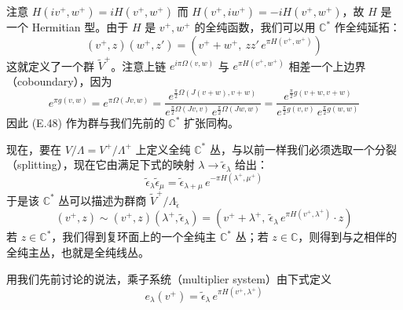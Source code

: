 
注意 $H(iv^+,w^+) = iH(v^+,w^+)$ 而 $H(v^+,iw^+) = -iH(v^+,w^+)$，故 $H$ 是一个
Hermitian 型。由于 $H$ 是 $v^+,w^+$ 的全纯函数，我们可以用 $\mathbb{C}^*$ 作全纯延拓：
\begin{equation}
  (v^+,z)(w^+,z') = \left(v^+ + w^+,\ zz'\,e^{\pi H(v^+,w^+)}\right)
  \tag{E.48}
  \label{eq:E.48}
\end{equation}
这就定义了一个群 $\tilde V^+$。注意上链 $e^{i\pi\Omega(v,w)}$ 与 $e^{\pi H(v^+,w^+)}$
相差一个上边界（coboundary），因为
\begin{equation}
  e^{\pi g(v,w)} = e^{\pi\Omega(Jv,w)}
  = \frac{e^{\frac{\pi}{2}\Omega(J(v+w),v+w)}}
         {e^{\frac{\pi}{2}\Omega(Jv,v)}\,e^{\frac{\pi}{2}\Omega(Jw,w)}}
  = \frac{e^{\frac{\pi}{2}g(v+w,v+w)}}
         {e^{\frac{\pi}{2}g(v,v)}\,e^{\frac{\pi}{2}g(w,w)}}
  \tag{E.49}
  \label{eq:E.49}
\end{equation}
因此 (E.48) 作为群与我们先前的 $\mathbb{C}^*$ 扩张同构。

现在，要在 $V/\Lambda = V^+/\Lambda^+$ 上定义全纯 $\mathbb{C}^*$ 丛，与以前一样我们必须选取一个分裂（splitting），现在它由满足下式的映射 $\lambda\to\tilde\epsilon_\lambda$ 给出：
\begin{equation}
  \tilde\epsilon_\lambda\tilde\epsilon_\mu
  = \tilde\epsilon_{\lambda+\mu}\,e^{-\pi H(\lambda^+,\mu^+)}
  \tag{E.50}
  \label{eq:E.50}
\end{equation}
于是该 $\mathbb{C}^*$ 丛可以描述为群商 $\tilde V^+/\Lambda_{\tilde\epsilon}$
\begin{equation}
  (v^+,z)\sim(v^+,z)(\lambda^+,\tilde\epsilon_\lambda)
  = \left(v^+ + \lambda^+,\ \tilde\epsilon_\lambda\,e^{\pi H(v^+,\lambda^+)}\cdot z\right)
  \tag{E.51}
  \label{eq:E.51}
\end{equation}
若 $z\in\mathbb{C}^*$，我们得到复环面上的一个全纯主 $\mathbb{C}^*$ 丛；若 $z\in\mathbb{C}$，则得到与之相伴的全纯主丛，也就是全纯线丛。

用我们先前讨论的说法，乘子系统（multiplier system）由下式定义
\begin{equation}
  e_\lambda(v^+) = \tilde\epsilon_\lambda\,e^{\pi H(v^+,\lambda^+)}
  \tag{E.52}
  \label{eq:E.52}
\end{equation}


